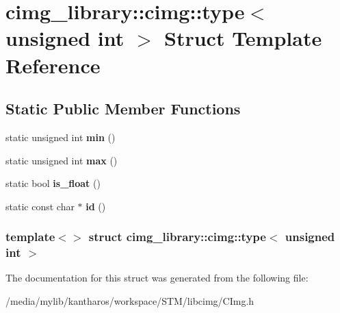 \hypertarget{structcimg__library_1_1cimg_1_1type_3_01unsigned_01int_01_4}{
\section{cimg\_\-library::cimg::type$<$ unsigned int $>$ Struct Template Reference}
\label{structcimg__library_1_1cimg_1_1type_3_01unsigned_01int_01_4}
}
\subsection*{Static Public Member Functions}
\begin{DoxyCompactItemize}
\item 
\hypertarget{structcimg__library_1_1cimg_1_1type_3_01unsigned_01int_01_4_ade83ed13ea846f7f2303a3eb668e4e7c}{
static unsigned int {\bfseries min} ()}
\label{structcimg__library_1_1cimg_1_1type_3_01unsigned_01int_01_4_ade83ed13ea846f7f2303a3eb668e4e7c}

\item 
\hypertarget{structcimg__library_1_1cimg_1_1type_3_01unsigned_01int_01_4_aabd62c9d0847db3de3a0fabfdcd9e10e}{
static unsigned int {\bfseries max} ()}
\label{structcimg__library_1_1cimg_1_1type_3_01unsigned_01int_01_4_aabd62c9d0847db3de3a0fabfdcd9e10e}

\item 
\hypertarget{structcimg__library_1_1cimg_1_1type_3_01unsigned_01int_01_4_aebebd8c49b3c82f7b1661893179cb1db}{
static bool {\bfseries is\_\-float} ()}
\label{structcimg__library_1_1cimg_1_1type_3_01unsigned_01int_01_4_aebebd8c49b3c82f7b1661893179cb1db}

\item 
\hypertarget{structcimg__library_1_1cimg_1_1type_3_01unsigned_01int_01_4_ac7454a7603f23841b48c854deed1c218}{
static const char $\ast$ {\bfseries id} ()}
\label{structcimg__library_1_1cimg_1_1type_3_01unsigned_01int_01_4_ac7454a7603f23841b48c854deed1c218}

\end{DoxyCompactItemize}
\subsubsection*{template$<$$>$ struct cimg\_\-library::cimg::type$<$ unsigned int $>$}



The documentation for this struct was generated from the following file:\begin{DoxyCompactItemize}
\item 
/media/mylib/kantharos/workspace/STM/libcimg/CImg.h\end{DoxyCompactItemize}
